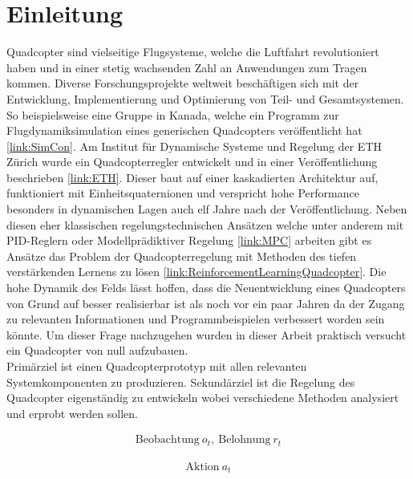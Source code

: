 \section{Einleitung} 
Quadcopter sind vielseitige Flugsysteme, welche die Luftfahrt revolutioniert haben und in einer stetig wachsenden Zahl an Anwendungen zum Tragen kommen. Diverse Forschungsprojekte weltweit beschäftigen sich mit der Entwicklung, Implementierung und Optimierung von Teil- und Gesamtsystemen. So beispielsweise eine Gruppe in Kanada, welche ein Programm zur Flugdynamiksimulation eines generischen Quadcopters veröffentlicht hat \ref{link:SimCon}. Am Institut für Dynamische Systeme und Regelung der ETH Zürich wurde ein Quadcopterregler entwickelt und in einer Veröffentlichung beschrieben \ref{link:ETH}. Dieser baut auf einer kaskadierten Architektur auf, funktioniert mit Einheitsquaternionen und verspricht hohe Performance besonders in dynamischen Lagen auch elf Jahre nach der Veröffentlichung. Neben diesen eher klassischen regelungstechnischen Ansätzen welche unter anderem mit PID-Reglern oder Modellprädiktiver Regelung \ref{link:MPC} arbeiten gibt es Ansätze das Problem der Quadcopterregelung mit Methoden des tiefen verstärkenden Lernens zu lösen \ref{link:ReinforcementLearningQuadcopter}. Die hohe Dynamik des Felds lässt hoffen, dass die Neuentwicklung eines Quadcopters von Grund auf besser realisierbar ist als noch vor ein paar Jahren da der Zugang zu relevanten Informationen und Programmbeispielen verbessert worden sein könnte. Um dieser Frage nachzugehen wurden in dieser Arbeit praktisch versucht ein Quadcopter von null aufzubauen.\\
Primärziel ist einen Quadcopterprototyp mit allen relevanten Systemkomponenten zu produzieren. Sekundärziel ist die Regelung des Quadcopter eigenständig zu entwickeln wobei verschiedene Methoden analysiert und erprobt werden sollen.

\begin{align}
    \text{Beobachtung}\ o_t,\ \text{Belohnung}\ r_t
\end{align}

\begin{align}
    \text{Aktion}\ a_t    
\end{align}